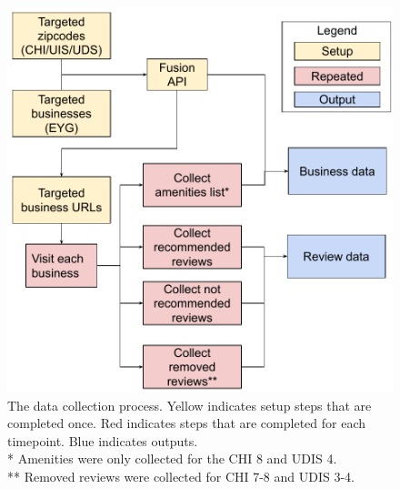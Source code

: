 \begin{figure}[b!]
    \centering
    \includegraphics[width=0.9\columnwidth]{chapters/reviews/figures/Crawl diagram.pdf}
    \caption{The data collection process. Yellow indicates setup steps that are completed once. Red indicates steps that are completed for each timepoint. Blue indicates outputs.\\
    * Amenities were only collected for the CHI 8 and UDIS 4.\\
    ** Removed reviews were collected for CHI 7-8 and UDIS 3-4. }
    \label{fig:crawling_diagram}
\end{figure}
